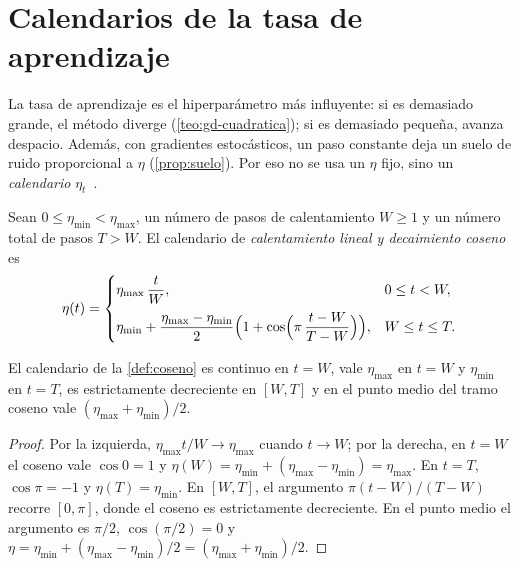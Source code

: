 \section{Calendarios de la tasa de aprendizaje}

La tasa de aprendizaje es el hiperparámetro más influyente: si es demasiado grande, el método diverge (\cref{teo:gd-cuadratica}); si es demasiado pequeña, avanza despacio. Además, con gradientes estocásticos, un paso constante deja un suelo de ruido proporcional a $\eta$ (\cref{prop:suelo}). Por eso no se usa un $\eta$ fijo, sino un \emph{calendario} $\eta_t$~\cite[§12.11]{d2l}.

\begin{definicion}\label{def:coseno}
Sean $0\le\eta_{\min}<\eta_{\max}$, un número de pasos de calentamiento $W\ge 1$ y un número total de pasos $T>W$. El calendario de \emph{calentamiento lineal y decaimiento coseno} es
\[
\eta(t)=\begin{cases}
\eta_{\max}\,\dfrac{t}{W}, & 0\le t<W,\\[3mm]
\eta_{\min}+\dfrac{\eta_{\max}-\eta_{\min}}{2}\Bigl(1+\cos\Bigl(\pi\,\dfrac{t-W}{T-W}\Bigr)\Bigr), & W\le t\le T.
\end{cases}
\]
\end{definicion}

\begin{proposicion}[Propiedades]\label{prop:coseno}
El calendario de la \cref{def:coseno} es continuo en $t=W$, vale $\eta_{\max}$ en $t=W$ y $\eta_{\min}$ en $t=T$, es estrictamente decreciente en $[W,T]$ y en el punto medio del tramo coseno vale $(\eta_{\max}+\eta_{\min})/2$.
\end{proposicion}

\begin{proof}
Por la izquierda, $\eta_{\max}t/W\to\eta_{\max}$ cuando $t\to W$; por la derecha, en $t=W$ el coseno vale $\cos 0=1$ y $\eta(W)=\eta_{\min}+(\eta_{\max}-\eta_{\min})=\eta_{\max}$. En $t=T$, $\cos\pi=-1$ y $\eta(T)=\eta_{\min}$. En $[W,T]$, el argumento $\pi(t-W)/(T-W)$ recorre $[0,\pi]$, donde el coseno es estrictamente decreciente. En el punto medio el argumento es $\pi/2$, $\cos(\pi/2)=0$ y $\eta=\eta_{\min}+(\eta_{\max}-\eta_{\min})/2=(\eta_{\max}+\eta_{\min})/2$.
\end{proof}

